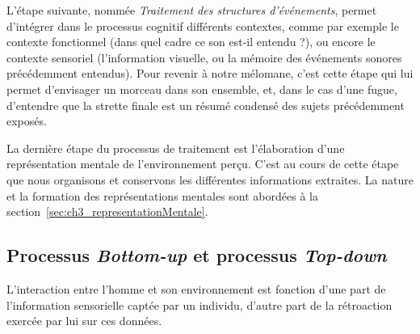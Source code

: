 L'étape suivante, nommée \emph{Traitement des structures d'événements}, permet d'intégrer dans le processus cognitif différents contextes, comme par exemple le contexte fonctionnel (dans quel cadre ce son est-il entendu ?), ou encore le contexte sensoriel (l'information visuelle, ou la mémoire des événements sonores précédemment entendus). Pour revenir à notre mélomane, c'est cette étape qui lui permet d'envisager un morceau dans son ensemble, et, dans le cas d'une fugue, d'entendre que la strette finale est un résumé condensé des sujets précédemment exposés.

La dernière étape du processus de traitement est l'élaboration d'une représentation mentale de l'environnement perçu. C'est au cours de cette étape que nous organisons et conservons les différentes informations extraites. La nature et la formation des représentations mentales sont abordées à la section~\ref{sec:ch3_representationMentale}.

\subsection{Processus \emph{Bottom-up} et processus \emph{Top-down}}
\label{sec:ch3_butd}

L'interaction entre l'homme et son environnement est fonction d'une part de l'information sensorielle captée par un individu, d'autre part de la rétroaction exercée par lui sur ces données. 



